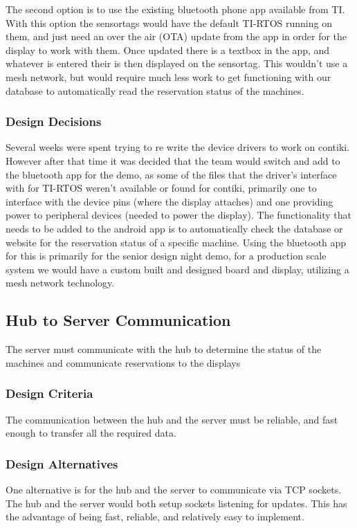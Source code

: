 \documentclass[PPFS.tex]{template/subfiles}
\begin{document}
The second option is to use the existing bluetooth phone app available from TI. With this option the sensortags would have the default TI-RTOS running on them, and just need an over the air (OTA) update from the app in order for the display to work with them. Once updated there is a textbox in the app, and whatever is entered their is then displayed on the sensortag. This wouldn't use a mesh network, but would require much less work to get functioning with our database to automatically read the reservation status of the machines. 

\subsubsection{Design Decisions}
Several weeks were spent trying to re write the device drivers to work on contiki. However after that time it was decided that the team would switch and add to the bluetooth app for the demo, as some of the files that the driver's interface with for TI-RTOS weren't available or found for contiki, primarily one to interface with the device pins (where the display attaches) and one providing power to peripheral devices (needed to power the display). The functionality that needs to be added to the android app is to automatically check the database or website for the reservation status of a specific machine. Using the bluetooth app for this is primarily for the senior design night demo, for a production scale system we would have a custom built and designed board and display, utilizing a mesh network technology. 

\subsection{Hub to Server Communication}
The server must communicate with the hub to determine the status of the machines and communicate reservations to the displays

\subsubsection{Design Criteria}
The communication between the hub and the server must be reliable, and fast enough to transfer all the required data.

\subsubsection{Design Alternatives}
One alternative is for the hub and the server to communicate via TCP sockets. The hub and the server would both setup sockets listening for updates. This has the advantage of being fast, reliable, and relatively easy to implement.
\end{document}
